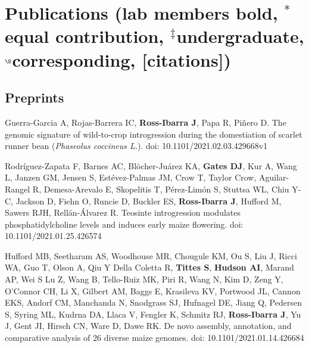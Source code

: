 \documentclass[letterpaper,10pt]{article}
\renewenvironment{itemize}{
  \begin{list}{}{
    \setlength{\leftmargin}{1.5em}
  }
}{
  \end{list}
}
\begin{document}
\section*{Publications {\small(lab members bold, $^*$equal contribution, $^\ddagger$undergraduate, $^\S$corresponding, [citations])}}


\subsection*{Preprints}
\begin{itemize}



\item Guerra-Garcia A, Rojas-Barrera IC, \textbf{Ross-Ibarra J}, Papa R, Pi\~nero D. The genomic signature of wild-to-crop introgression during the domestiation of scarlet runner bean (\textit{Phaseolus coccineus L.}). doi: 10.1101/2021.02.03.429668v1

\item Rodr\'iguez-Zapata F, Barnes AC, Bl\"{o}cher-Ju\'arez KA, \textbf{Gates DJ}, Kur A,  Wang L, Janzen GM,  Jensen S, Est\'evez-Palmas JM, Crow T, Taylor Crow, Aguilar-Rangel R, Demesa-Arevalo E, Skopelitis T, P\'erez-Lim\'on S, Stuttsa WL, Chiu Y-C, Jackson D, Fiehn O, Runcie D, Buckler ES, \textbf{Ross-Ibarra J}, Hufford M, Sawers RJH, Rell\'an-\'Alvarez R. Teosinte introgression modulates phosphatidylcholine levels and induces early maize flowering. doi: 10.1101/2021.01.25.426574

\item Hufford MB, Seetharam AS, Woodhouse MR, Chougule KM, Ou S, Liu J, Ricci WA, Guo T, Olson A, Qiu Y Della Coletta R, \textbf{Tittes S}, \textbf{Hudson AI},  Marand AP, Wei S Lu Z, Wang B, Tello-Ruiz MK, Piri R, Wang N, Kim D, Zeng Y, O'Connor CH, Li X, Gilbert AM, Baggs E, Krasileva KV, Portwood JL, Cannon EKS, Andorf CM, Manchanda N, Snodgrass SJ, Hufnagel DE, Jiang Q, Pedersen S, Syring ML, Kudrna DA, Llaca V, Fengler K, Schmitz RJ, \textbf{Ross-Ibarra J}, Yu J, Gent JI, Hirsch CN, Ware D, Dawe RK. De novo assembly, annotation, and comparative analysis of 26 diverse maize genomes. doi: 10.1101/2021.01.14.426684


\end{itemize}
\end{document}
